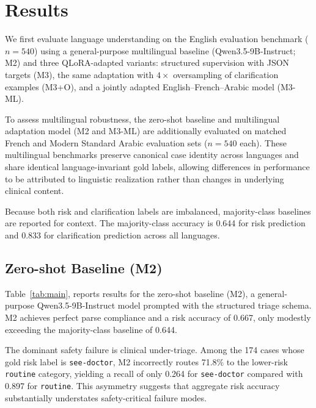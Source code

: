 
\section{Results}
\label{sec:results}
We first evaluate language understanding on the English evaluation benchmark ($n=540$) using a general-purpose multilingual baseline (Qwen3.5-9B-Instruct; M2) and three QLoRA-adapted variants: structured supervision with JSON targets (M3), the same adaptation with $4\times$ oversampling of clarification examples (M3+O), and a jointly adapted English--French--Arabic model (M3-ML).

To assess multilingual robustness, the zero-shot baseline and multilingual adaptation model (M2 and M3-ML) are additionally evaluated on matched French and Modern Standard Arabic evaluation sets ($n=540$ each). These multilingual benchmarks preserve canonical case identity across languages and share identical language-invariant gold labels, allowing differences in performance to be attributed to linguistic realization rather than changes in underlying clinical content.

Because both risk and clarification labels are imbalanced, majority-class baselines are reported for context. The majority-class accuracy is 0.644 for risk prediction and 0.833 for clarification prediction across all languages.

\subsection{Zero-shot Baseline (M2)}
Table~\ref{tab:main}, reports results for the zero-shot baseline (M2), a general-purpose Qwen3.5-9B-Instruct model prompted with the structured triage schema. M2 achieves perfect parse compliance and a risk accuracy of 0.667, only modestly exceeding the majority-class baseline of 0.644.

The dominant safety failure is clinical under-triage. Among the 174 cases whose gold risk label is \texttt{see-doctor}, M2 incorrectly routes 71.8\% to the lower-risk \texttt{routine} category, yielding a recall of only 0.264 for \texttt{see-doctor} compared with 0.897 for \texttt{routine}. This asymmetry suggests that aggregate risk accuracy substantially understates safety-critical failure modes.

